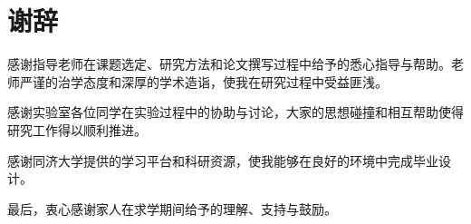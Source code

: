 \chapter*{谢辞}

感谢指导老师在课题选定、研究方法和论文撰写过程中给予的悉心指导与帮助。老师严谨的治学态度和深厚的学术造诣，使我在研究过程中受益匪浅。

感谢实验室各位同学在实验过程中的协助与讨论，大家的思想碰撞和相互帮助使得研究工作得以顺利推进。

感谢同济大学提供的学习平台和科研资源，使我能够在良好的环境中完成毕业设计。

最后，衷心感谢家人在求学期间给予的理解、支持与鼓励。
